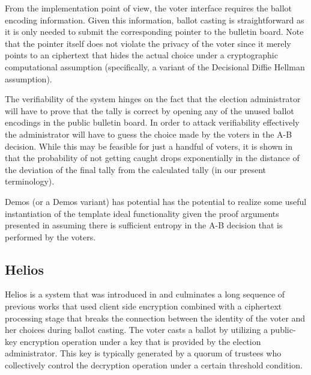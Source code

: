 From the implementation point of view, the voter interface requires
the ballot encoding information. Given this information, ballot
casting is straightforward as it is only needed to submit the
corresponding pointer to the bulletin board. Note that the pointer
itself does not violate the privacy of the voter since it merely
points to an ciphertext that hides the actual choice under a
cryptographic computational assumption (specifically, a variant of the
Decisional Diffie Hellman assumption).

The verifiability of the system hinges on the fact that the election
administrator will have to prove that the tally is correct by opening
any of the unused ballot encodings in the public bulletin board. In
order to attack verifiability effectively the administrator will have
to guess the choice made by the voters in the A-B decision. While this
may be feasible for just a handful of voters, it is shown in
\cite{demos} that the probability of not getting caught drops
exponentially in the distance of the deviation of the final tally from
the calculated tally (in our present terminology).

Demos (or a Demos variant) has potential has the potential to realize
some useful instantiation of the template ideal functionality given
the proof arguments presented in \cite{demos} assuming there is
sufficient entropy in the A-B decision that is performed by the
voters.

\subsection{Helios}

Helios is a system that was introduced in \cite{helios} and culminates
a long sequence of previous works that used client side encryption
combined with a ciphertext processing stage that breaks the connection
between the identity of the voter and her choices during ballot
casting. The voter casts a ballot by utilizing a public-key encryption
operation under a key that is provided by the election
administrator. This key is typically generated by a quorum of trustees
who collectively control the decryption operation under a certain
threshold condition.

